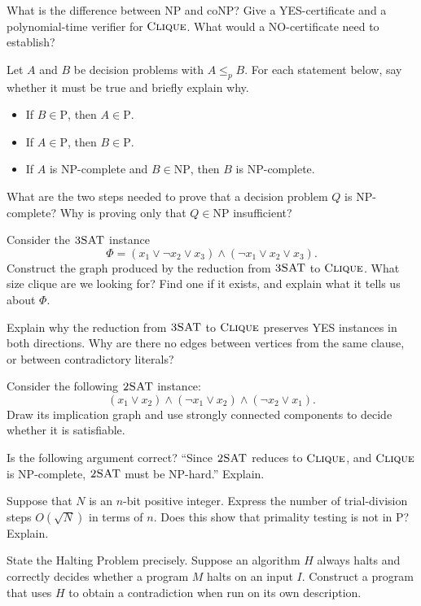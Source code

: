 \documentclass[11 pt]{exam}
\begin{document}
	\begin{questions}

		\question What is the difference between $\mathrm{NP}$ and $\mathrm{coNP}$? Give a YES-certificate and a polynomial-time verifier for $\textsc{Clique}$. What would a NO-certificate need to establish?

		\question Let $A$ and $B$ be decision problems with $A\leq_p B$. For each statement below, say whether it must be true and briefly explain why.
		\begin{itemize}
			\item If $B\in\mathrm{P}$, then $A\in\mathrm{P}$.
			\item If $A\in\mathrm{P}$, then $B\in\mathrm{P}$.
			\item If $A$ is $\mathrm{NP}$-complete and $B\in\mathrm{NP}$, then $B$ is $\mathrm{NP}$-complete.
		\end{itemize}

		\question What are the two steps needed to prove that a decision problem $Q$ is $\mathrm{NP}$-complete? Why is proving only that $Q\in\mathrm{NP}$ insufficient?

		\question Consider the $\textsc{3SAT}$ instance
		\[
			\Phi=(x_1\vee\neg x_2\vee x_3)\wedge(\neg x_1\vee x_2\vee x_3).
		\]
		Construct the graph produced by the reduction from $\textsc{3SAT}$ to $\textsc{Clique}$. What size clique are we looking for? Find one if it exists, and explain what it tells us about $\Phi$.

		\question Explain why the reduction from $\textsc{3SAT}$ to $\textsc{Clique}$ preserves YES instances in both directions. Why are there no edges between vertices from the same clause, or between contradictory literals?

		\question Consider the following $\textsc{2SAT}$ instance:
		\[
			(x_1\vee x_2)\wedge(\neg x_1\vee x_2)\wedge(\neg x_2\vee x_1).
		\]
		Draw its implication graph and use strongly connected components to decide whether it is satisfiable.

		\question Is the following argument correct? ``Since $\textsc{2SAT}$ reduces to $\textsc{Clique}$, and $\textsc{Clique}$ is $\mathrm{NP}$-complete, $\textsc{2SAT}$ must be $\mathrm{NP}$-hard.'' Explain.

		\question Suppose that $N$ is an $n$-bit positive integer. Express the number of trial-division steps $O(\sqrt{N})$ in terms of $n$. Does this show that primality testing is not in $\mathrm{P}$? Explain.

		\question State the Halting Problem precisely. Suppose an algorithm $H$ always halts and correctly decides whether a program $M$ halts on an input $I$. Construct a program that uses $H$ to obtain a contradiction when run on its own description.


\end{questions}
\end{document}
